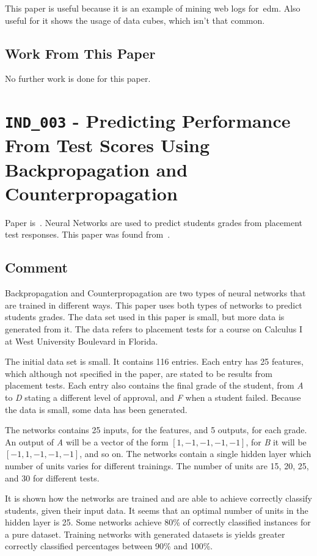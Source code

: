 This paper is useful because it is an example of mining web logs for~\gls{edm}.
Also useful for it shows the usage of data cubes, which isn't that common.

\subsection{Work From This Paper}

No further work is done for this paper.

\section{\texttt{IND\_003} - Predicting Performance From Test Scores Using
Backpropagation and Counterpropagation}

Paper is~\cite{ind_003}. Neural Networks are used to predict students grades
from placement test responses. This paper was found from~\cite{ind_001}.

\subsection{Comment}

Backpropagation and Counterpropagation are two types of neural networks that
are trained in different ways. This paper uses both types of networks to
predict students grades. The data set used in this paper is small, but more
data is generated from it. The data refers to placement tests for a course on
Calculus I at West University Boulevard in Florida.

The initial data set is small. It contains 116 entries. Each entry has 25
features, which although not specified in the paper, are stated to be results
from placement tests. Each entry also contains the final grade of the student,
from \textit{A} to \textit{D} stating a different level of approval, and
\textit{F} when a student failed. Because the data is small, some data has been
generated.

The networks contains 25 inputs, for the features, and 5 outputs, for each
grade. An output of \textit{A} will be a vector of the form $ [1, -1, -1, -1,
-1] $, for \textit{B} it will be $ [-1, 1, -1, -1, -1] $, and so on. The
networks contain a single hidden layer which number of units varies for
different trainings. The number of units are 15, 20, 25, and 30 for different
tests.

It is shown how the networks are trained and are able to achieve correctly
classify students, given their input data. It seems that an optimal number of
units in the hidden layer is 25. Some networks achieve 80\% of correctly
classified instances for a pure dataset. Training networks with generated
datasets is yields greater correctly classified percentages between 90\% and
100\%.

